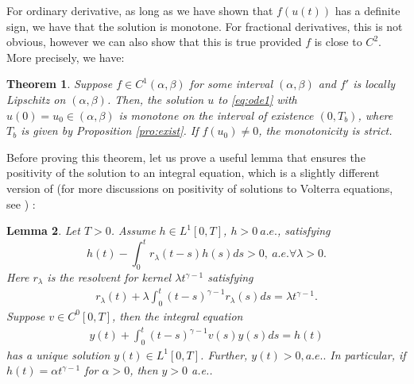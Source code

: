 \documentclass[12pt]{amsart}%
\newtheorem{thm}{Theorem}[section]
\newtheorem{lmm}[thm]{Lemma}
\theoremstyle{definition}
\theoremstyle{remark}
\begin{document}
For ordinary derivative, as long as we have shown that $f(u(t))$ has a definite sign,  we have that the solution is monotone. For fractional derivatives, this is not obvious, however we can also show that this is true provided $f$ is close to $C^2$. More precisely, we have:

\begin{thm}\label{thm:mon}
Suppose $f\in C^{1}(\alpha, \beta)$ for some interval $(\alpha, \beta)$ and $f'$ is locally Lipschitz on $(\alpha, \beta)$. Then, the solution $u$ to \eqref{eq:ode1} with $u(0)=u_0\in (\alpha, \beta)$ is monotone on  the interval of existence $(0, T_b)$, where $T_b$ is given by Proposition \ref{pro:exist}. If $f(u_0)\neq 0$, the monotonicity is strict.
\end{thm}

Before proving this theorem, let us prove a useful lemma that ensures the positivity of the solution to an integral equation, which is a slightly different version of \cite[Theorem 1]{weis75} (for more discussions on  positivity of solutions to Volterra equations, see \cite{cn79, weis75}) :
\begin{lmm}\label{lmm:pos}
Let $T>0$. Assume $h\in L^1[0,T]$, $h>0~a.e.$, satisfying \[
h(t)-\int_0^tr_{\lambda}(t-s) h(s)ds>0, ~a.e. \forall \lambda>0.
\]
Here $r_{\lambda}$ is the resolvent for kernel $\lambda t^{\gamma-1}$ satisfying 
\begin{gather}\label{eq:resolvent}
r_{\lambda}(t)+\lambda\int_0^t(t-s)^{\gamma-1}r_{\lambda}(s)ds=\lambda t^{\gamma-1}.
\end{gather}
Suppose $v\in C^0[0,T]$, then the integral equation 
\begin{gather}\label{eq:varcoevol}
y(t)+\int_0^t(t-s)^{\gamma-1}v(s) y(s)ds=h(t)
\end{gather}
has a unique solution  $y(t)\in L^1[0, T]$. Further, $
y(t)>0, a.e..
$
In particular, if $h(t)=\alpha t^{\gamma-1}$ for $\alpha>0$, then $y>0$ a.e..
\end{lmm}
\end{document}
